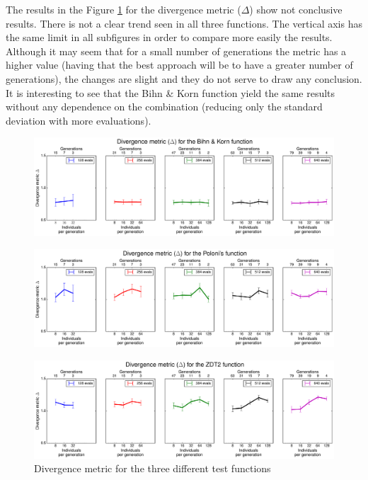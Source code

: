 The results in the Figure \ref{fig:diverMetric} for the divergence metric ($\Delta$) show not conclusive results. There is not a clear trend seen in all three functions. The vertical axis has the same limit in all subfigures in order to compare more easily the results. Although it may seem that for a small number of generations the metric has a higher value (having that the best approach will be to have a greater number of generations), the changes are slight and they do not serve to draw any conclusion. It is interesting to see that the Bihn \& Korn function yield the same results without any dependence on the combination (reducing only the standard deviation with more evaluations).

    \newpage
    
    \begin{figure}[h!]
        \centering
        \includegraphics[width=\textwidth]{Figures/3/diverMetric_BK.pdf}
    \end{figure}
    \begin{figure}[h!]
        \centering
        \includegraphics[width=\textwidth]{Figures/3/diverMetric_POL.pdf}
    \end{figure}
    \begin{figure}[h!]
        \centering
        \includegraphics[width=\textwidth]{Figures/3/diverMetric_ZDT.pdf}
        \caption{Divergence metric for the three different test functions}
        \label{fig:diverMetric}
    \end{figure}

